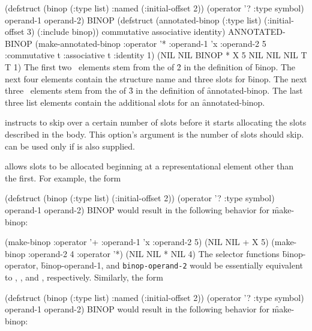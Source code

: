 \code
 (defstruct (binop (:type list) :named (:initial-offset 2))
   (operator '? :type symbol)   
   operand-1
   operand-2) \EV BINOP
 (defstruct (annotated-binop (:type list)
                             (:initial-offset 3)
                             (:include binop))
  commutative associative identity) \EV ANNOTATED-BINOP
 (make-annotated-binop :operator '*
                       :operand-1 'x
                       :operand-2 5
                       :commutative t
                       :associative t
                       :identity 1)
   \EV (NIL NIL BINOP * X 5 NIL NIL NIL T T 1)
\endcode
The first two \nil\ elements stem from the  of \f{2}
in the definition of \f{binop}.  The next four elements contain the
structure name and three slots for \f{binop}.  The next three \nil\ elements
stem from the  of \f{3} in the definition of
\f{annotated-binop}.  The last three list elements contain the additional
slots for an \f{annotated-binop}.



 instructs  to skip over a certain
number of slots before it starts allocating the slots described in the
body.  This option's argument is the number of slots  
should skip.   can be used only if  is also supplied.


 allows 
slots to be allocated beginning at a representational
element other than the first.  For example, the form

\code
 (defstruct (binop (:type list) (:initial-offset 2))
   (operator '? :type symbol)
   operand-1
   operand-2) \EV BINOP
\endcode
would result in the following behavior for \f{make-binop}:

\code
 (make-binop :operator '+ :operand-1 'x :operand-2 5)
\EV (NIL NIL + X 5)
 (make-binop :operand-2 4 :operator '*)
\EV (NIL NIL * NIL 4)
\endcode
The selector functions
\f{binop-operator}, \f{binop-operand-1},
and {\tt binop-operand-2} would be essentially equivalent to ,
, and , respectively.
Similarly, the form

\code
 (defstruct (binop (:type list) :named (:initial-offset 2))
   (operator '? :type symbol)
   operand-1
   operand-2) \EV BINOP
\endcode
would result in the following behavior for \f{make-binop}:
                    
